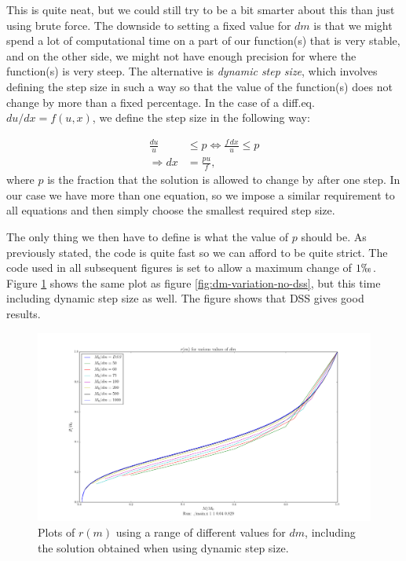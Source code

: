\documentclass[11pt,twocolumn]{article}
\begin{document}
This is quite neat, but we could still try to be a bit smarter about
this than just using brute force. The downside to setting a fixed value for $dm$ is that we might spend
a lot of computational time on a part of our function(s) that is very
stable, and on the other side, we might not have enough precision for
where the function(s) is very steep. The alternative is \emph{dynamic
  step size}, which involves defining the step size in such a way so
that the value of the function(s) does not change by more than a fixed
percentage. In the case of a diff.eq. $du/dx = f(u,x)$, we define the
step size in the following way:

\begin{align}
  \frac{du}{u} &\leq p\Leftrightarrow \frac{f\,dx}{u} \leq p\\
  \Rightarrow dx &= \frac{pu}{f},
\end{align}
where $p$ is the fraction that the solution is allowed to change by
after one step. In our case we have more than one equation, so we
impose a similar requirement to all equations and then simply choose
the smallest required step size.

The only thing we then have to define is what the value of $p$ should
be. As previously stated, the code is quite fast so we can afford to
be quite strict. The code used in all subsequent figures is set to
allow a maximum change of $1 \permil$. Figure \ref{fig:dm_variation}
shows the same plot as figure \ref{fig:dm-variation-no-dss}, but this
time including dynamic step size as well. The figure shows that DSS
gives good results. 

\begin{figure}[ht]
  \centering
  \includegraphics[width=\linewidth]{fig/dm_variation.png}
  \caption{\label{fig:dm_variation} Plots of $r(m)$ using a range of
    different values for $dm$, including the solution obtained when
    using dynamic step size.}
\end{figure}
\end{document}
